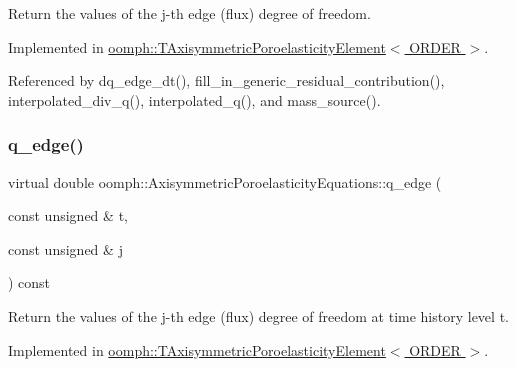 Return the values of the j-\/th edge (flux) degree of freedom. 



Implemented in \hyperlink{classoomph_1_1TAxisymmetricPoroelasticityElement_a155b8606a7c2602cc88ec15ae0a19a8f}{oomph\+::\+T\+Axisymmetric\+Poroelasticity\+Element$<$ O\+R\+D\+E\+R $>$}.



Referenced by dq\+\_\+edge\+\_\+dt(), fill\+\_\+in\+\_\+generic\+\_\+residual\+\_\+contribution(), interpolated\+\_\+div\+\_\+q(), interpolated\+\_\+q(), and mass\+\_\+source().

\mbox{\label{classoomph_1_1AxisymmetricPoroelasticityEquations_a8e5f2e3dbc4711493ca9eb80a9ee3911}} 
\subsubsection{\texorpdfstring{q\+\_\+edge()}{q\_edge()}\hspace{0.1cm}{\footnotesize\ttfamily [2/2]}}
{\footnotesize\ttfamily virtual double oomph\+::\+Axisymmetric\+Poroelasticity\+Equations\+::q\+\_\+edge (\begin{DoxyParamCaption}\item[{const unsigned \&}]{t,  }\item[{const unsigned \&}]{j }\end{DoxyParamCaption}) const\hspace{0.3cm}{\ttfamily [pure virtual]}}



Return the values of the j-\/th edge (flux) degree of freedom at time history level t. 



Implemented in \hyperlink{classoomph_1_1TAxisymmetricPoroelasticityElement_aecff7a5e70e3567800d142f0fb24660e}{oomph\+::\+T\+Axisymmetric\+Poroelasticity\+Element$<$ O\+R\+D\+E\+R $>$}.

\mbox{\label{classoomph_1_1AxisymmetricPoroelasticityEquations_a278e2b053f4c30b9da7a00ec063f1d7f}} 
